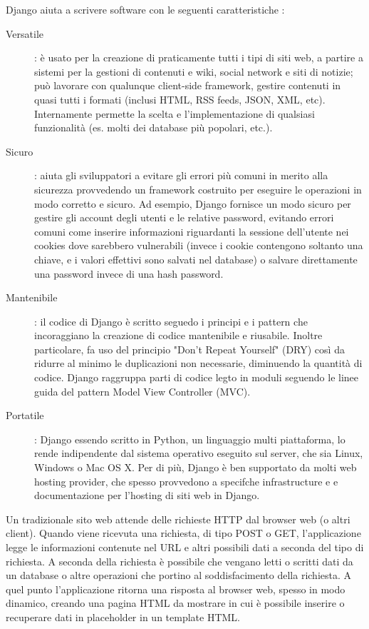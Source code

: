 Django aiuta a scrivere software con le seguenti caratteristiche \cite{django-documentation}:
\begin{description}
	\item[Versatile]: è usato per la creazione di praticamente tutti i tipi di siti web, a partire a sistemi per la gestioni di contenuti e wiki,
	social network e siti di notizie; può lavorare con qualunque client-side framework, gestire contenuti in quasi tutti i formati (inclusi HTML, 
	RSS feeds, JSON, XML, etc). Internamente permette la scelta e l'implementazione di qualsiasi funzionalità (es. molti dei database più popolari, etc.).
	\item[Sicuro]: aiuta gli sviluppatori a evitare gli errori più comuni in merito alla sicurezza provvedendo un framework costruito per eseguire 
	le operazioni in modo corretto e sicuro. Ad esempio, Django fornisce un modo sicuro per gestire gli account degli utenti e le relative
	password, evitando errori comuni come inserire informazioni riguardanti la sessione dell'utente nei cookies dove sarebbero vulnerabili (invece i cookie
	contengono soltanto una chiave, e i valori effettivi sono salvati nel database) o salvare direttamente una password invece di una hash password.
	\item[Mantenibile]: il codice di Django è scritto seguedo i principi e i pattern che incoraggiano la creazione di codice mantenibile e riusabile. Inoltre
	particolare, fa uso del principio "Don't Repeat Yourself" (DRY) così da ridurre al minimo le duplicazioni non necessarie, diminuendo la quantità di codice.
	Django raggruppa parti di codice legto in moduli seguendo le linee guida del pattern Model View Controller (MVC).
	\item[Portatile]: Django essendo scritto in Python, un linguaggio multi piattaforma, lo rende indipendente dal sistema operativo eseguito sul server, che
	sia Linux, Windows o Mac OS X. Per di più, Django è ben supportato da molti web hosting provider, che spesso provvedono a specifche infrastructure e 
	e documentazione per l'hosting di siti web in Django.
\end{description}


Un tradizionale sito web attende delle richieste HTTP dal browser web (o altri client). Quando viene ricevuta una richiesta, di tipo POST o GET, l'applicazione 
legge le informazioni contenute nel URL e altri possibili dati a seconda del tipo di richiesta. A seconda della richiesta è possibile che vengano letti o 
scritti dati da un database o altre operazioni che portino al soddisfacimento della richiesta. A quel punto l'applicazione ritorna una risposta al browser 
web, spesso in modo dinamico, creando una pagina HTML da mostrare in cui è possibile inserire o recuperare dati in placeholder in un template HTML.

